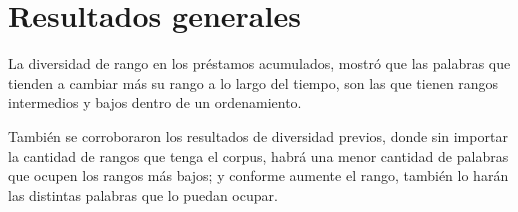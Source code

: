 


\section{Resultados generales}

La diversidad de rango en los préstamos acumulados, mostró que las palabras que tienden a cambiar más su rango a lo largo del tiempo, son las que tienen rangos intermedios y bajos dentro de un ordenamiento.

También se corroboraron los resultados de diversidad previos, donde sin importar la cantidad de rangos que tenga el corpus, habrá una menor cantidad de palabras que ocupen los rangos más bajos;  y conforme aumente el rango, también lo harán las distintas palabras que lo puedan ocupar. 


 




